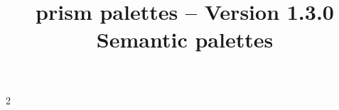 \documentclass{tutodoc}
\title{\raisebox{-.20ex}{@}prism palettes -- Version 1.3.0\\ Semantic palettes}
\date{}
\begin{document}
\maketitle{}

{
  \setlength{\columnsep}{2cm}
  \setlength{\columnseprule}{0.4pt}

  \begin{multicols}{2}
    \tableofcontents
  \end{multicols}
}

\newpage


















\end{document}
